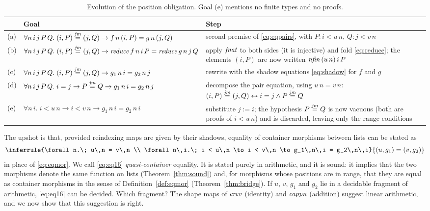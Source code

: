 \documentclass{fundam}
\begin{document}
\begin{table}[t]
  \centering
  \footnotesize
  \caption{Evolution of the position obligation.  Goal (e) mentions no finite types and
    no proofs.}\label{tab:goal}
  \begin{tabular}{@{}llp{5.6cm}@{}}
    \toprule
    & Goal & Step \\
    \midrule
    (a) & $\forall n\,i\,j\,P\,Q.\; (i,P) \mathrel{\stackrel{\mathit{jm}}{=}} (j,Q) \to f\,n\,(i,P) = g\,n\,(j,Q)$
        & second premise of \eqref{eq:eqpairs}, with $P : i < u\,n$, $Q : j < v\,n$ \\
    (b) & $\forall n\,i\,j\,P\,Q.\; (i,P) \mathrel{\stackrel{\mathit{jm}}{=}} (j,Q) \to \mathit{reduce}\,f\,n\,i\,P = \mathit{reduce}\,g\,n\,j\,Q$
        & apply $\mathit{fnat}$ to both sides (it is injective) and fold
          \eqref{eq:reduce}; the elements $(i,P)$ are now written $\mathit{nfin}\,(u\,n)\,i\,P$ \\
    (c) & $\forall n\,i\,j\,P\,Q.\; (i,P) \mathrel{\stackrel{\mathit{jm}}{=}} (j,Q) \to g_1\,n\,i = g_2\,n\,j$
        & rewrite with the shadow equations \eqref{eq:shadow} for $f$ and $g$ \\
    (d) & $\forall n\,i\,j\,P\,Q.\; i = j \to P \mathrel{\stackrel{\mathit{jm}}{=}} Q \to g_1\,n\,i = g_2\,n\,j$
        & decompose the pair equation, using $u\,n = v\,n$:
          $(i,P) \mathrel{\stackrel{\mathit{jm}}{=}} (j,Q) \leftrightarrow i = j \wedge P \mathrel{\stackrel{\mathit{jm}}{=}} Q$ \\
    (e) & $\forall n\,i.\; i < u\,n \to i < v\,n \to g_1\,n\,i = g_2\,n\,i$
        & substitute $j := i$; the hypothesis $P \mathrel{\stackrel{\mathit{jm}}{=}} Q$ is now vacuous (both are proofs
          of $i < u\,n$) and is discarded, leaving only the range conditions \\
    \bottomrule
  \end{tabular}
\end{table}

The upshot is that, provided reindexing maps are given by their shadows, equality of
container morphisms between lists can be stated as
\begin{equation}\label{eq:eq16}
  \inferrule{\forall n.\; u\,n = v\,n \\
             \forall n\,i.\; i < u\,n \to i < v\,n \to g_1\,n\,i = g_2\,n\,i}
            {(u, g_1) = (v, g_2)}
\end{equation}
in place of \eqref{eq:eqmor}.  We call \eqref{eq:eq16} \emph{quasi-container} equality.
It is stated purely in arithmetic, and it is sound: it implies that the two morphisms
denote the same function on lists (Theorem~\ref{thm:sound}) and, for morphisms whose
positions are in range, that they are equal as container morphisms in the sense of
Definition~\ref{def:eqmor} (Theorem~\ref{thm:bridge}).  If $u$, $v$, $g_1$ and $g_2$
lie in a decidable fragment of arithmetic, \eqref{eq:eq16} can be decided.  Which
fragment?  The shape maps of $\mathit{crev}$ (identity) and $\mathit{cappn}$ (addition) suggest
linear arithmetic, and we now show that this suggestion is right.
\end{document}
